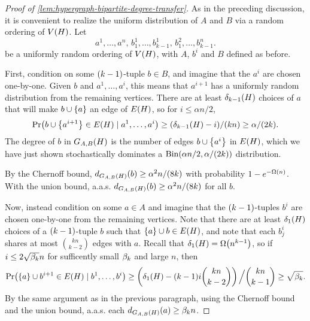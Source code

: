 \documentclass[11pt,english]{article}
\theoremstyle{plain}
\theoremstyle{definition}
\theoremstyle{definition}
\theoremstyle{plain}
\theoremstyle{plain}
\theoremstyle{plain}
\theoremstyle{plain}
\theoremstyle{remark}
\theoremstyle{remark}
\let\originalleft\left
\let\originalright\right
\renewcommand{\left}{\mathopen{}\mathclose\bgroup\originalleft}
\renewcommand{\right}{\aftergroup\egroup\originalright}
\begin{document}
\begin{proof}
[Proof of \ref{lem:hypergraph-bipartite-degree-transfer}]As in the preceding discussion, it is convenient to realize the uniform
distribution of $A$ and $B$ via a random ordering of $V\left(H\right)$.
Let 
\[
a^{1},\dots,a^{n},\, b_{1}^{1},\dots,b_{k-1}^{1},\, b_{1}^{2},\dots,b_{k-1}^{n}.
\]
be a uniformly random ordering of $V\left(H\right)$, with $A$, $b^i$ and
$B$ defined as before.

First, condition on some $\left(k-1\right)$-tuple $b\in B$, and imagine that the $a^i$ are chosen one-by-one. Given $b$ and $a^{1},\dots,a^{i}$, this means that $a^{i+1}$ has a uniformly random distribution from the remaining vertices. There are at least $\delta_{k-1}\left(H\right)$ choices of $a$ that will make $b\cup\left\{a\right\}$ an edge of $E\left(H\right)$, so for $i\le\alpha n/2$,
\[
\Pr\left(b\cup\left\{ a^{i+1}\right\} \in E\left(H\right)\mid a^{1},\dots,a^{i}\right)\ge\left(\delta_{k-1}\left(H\right)-i\right)/\left(kn\right)\ge\alpha/\left(2k\right).
\]
The degree of $b$ in $G_{A,B}\left(H\right)$ is the number of edges $b\cup\left\{ a^{i}\right\}$ in $E\left(H\right)$, which we have just shown stochastically dominates a $\Bin(\alpha n/2,\alpha/\left(2k\right))$ distribution.
\begin{comment}This means we can couple our random ordering with a sequence of independent random variables $X_1,\dots,X_{\alpha n/2}$ each having a Bernoulli distribution with parameter $\alpha/\left(2k\right)$, in such a way that $d_{G_{A,B}\left(H\right)}\left(b\right)\ge\sum_{i=1}^{\alpha n/2}X_i$. \end{comment}
By the Chernoff bound, $d_{G_{A,B}\left(H\right)}\left(b\right)\ge\alpha^{2}n/\left(8k\right)$
with probability $1-e^{-\Omega\left(n\right)}$. With the union bound, a.a.s. $d_{G_{A,B}\left(H\right)}\left(b\right)\ge\alpha^{2}n/\left(8k\right)$ for all $b$.

Now, instead condition on some $a\in A$ and imagine that the $\left(k-1\right)$-tuples $b^i$ are chosen one-by-one from the remaining vertices. Note that there are at least $\delta_{1}\left(H\right)$ choices of a $\left(k-1\right)$-tuple $b$ such that $\left\{a\right\}\cup b\in E\left(H\right)$, and note that each $b_{j}^{i}$
shares at most ${kn \choose k-2}$ edges with $a$. Recall that $\delta_1\left(H\right)=\Omega\left(n^{k-1}\right)$, so  if $i\le2\sqrt{\beta_k}n$ for sufficently small $\beta_k$ and large $n$,
then
\[
\Pr\left(\left\{ a\right\} \cup b^{i+1}\in E\left(H\right)\mid b^{1},\dots,b^{i}\right)\ge\left(\delta_{1}\left(H\right)-\left(k-1\right)i{kn \choose k-2}\right)\left.\vphantom{\sum}\right/{kn \choose k-1}\ge\sqrt{\amat}.
\]
By the same argument as in the previous paragraph, using the Chernoff bound and the union bound, a.a.s. each $d_{G_{A,B}\left(H\right)}\left(a\right)\ge\amat n$.
\end{proof}
\end{document}

